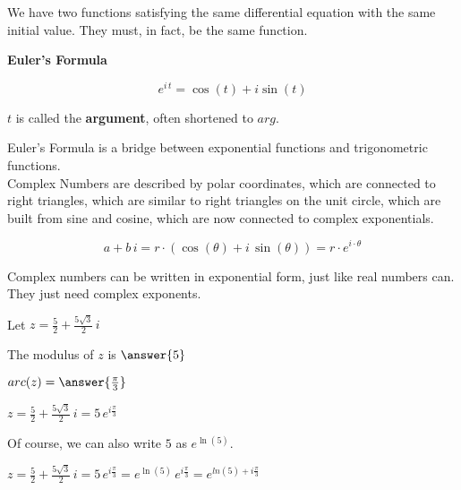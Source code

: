 \documentclass{ximera}
\begin{document}
We have two functions satisfying the same differential equation with the same initial value.  They must, in fact, be the same function. \\




\begin{theorem} \textbf{\textcolor{green!50!black}{Euler's Formula}}   


\[   e^{i \, t} = \cos(t) + i \sin(t)         \]



$t$ is called the \textbf{argument}, often shortened to $arg$.  

\end{theorem}




Euler's Formula is a bridge between exponential functions and trigonometric functions. \\




Complex Numbers are described by polar coordinates, which are connected to right triangles, which are similar to right triangles on the unit circle, which are built from sine and cosine, which are now connected to complex exponentials.




\begin{center}


\[
a + b \, i =  r \cdot (\cos(\theta) + i \, \sin(\theta)) = r \cdot e^{i \cdot \theta}
\]

\end{center}


Complex numbers can be written in exponential form, just like real numbers can.  They just need complex exponents.



\begin{example}


Let $z = \frac{5}{2} + \frac{5\sqrt{3}}{2} \, i$

The modulus of $z$ is $\answer{5}$ 

$arc(z) = \answer{\frac{\pi}{3}}$


$z = \frac{5}{2} + \frac{5\sqrt{3}}{2} \, i = 5 \, e^{i \tfrac{\pi}{3}}$

\end{example}




Of course, we can also write $5$ as $e^{\ln(5)}$.


$z = \frac{5}{2} + \frac{5\sqrt{3}}{2} \, i = 5 \, e^{i \tfrac{\pi}{3}} = e^{\ln(5)} \, e^{i \tfrac{\pi}{3}} = e^{ln(5) + i \tfrac{\pi}{3}}$
\end{document}
